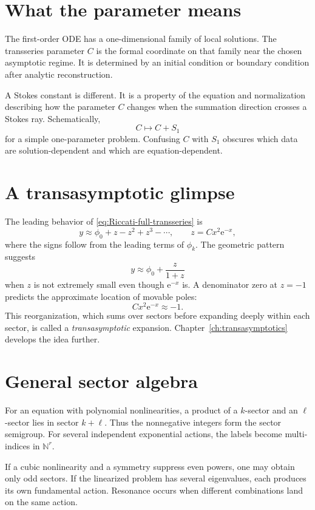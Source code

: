 \documentclass[11pt,openany]{book}
\theoremstyle{definition}
\theoremstyle{plain}
\theoremstyle{remark}
\newcommand{\N}{\mathbb{N}}
\newcommand{\e}{\mathrm{e}}
\begin{document}
\section{What the parameter means}

The first-order ODE has a one-dimensional family of local solutions. The transseries parameter $C$ is the formal coordinate on that family near the chosen asymptotic regime. It is determined by an initial condition or boundary condition after analytic reconstruction.

A Stokes constant is different. It is a property of the equation and normalization describing how the parameter $C$ changes when the summation direction crosses a Stokes ray. Schematically,
\[
 C\longmapsto C+S_1
\]
for a simple one-parameter problem. Confusing $C$ with $S_1$ obscures which data are solution-dependent and which are equation-dependent.

\section{A transasymptotic glimpse}

The leading behavior of \cref{eq:Riccati-full-transseries} is
\[
 y\approx\phi_0+
 z-z^2+z^3-\cdots,
 \qquad
 z=Cx^2\e^{-x},
\]
where the signs follow from the leading terms of $\phi_k$. The geometric pattern suggests
\begin{equation}\label{eq:Riccati-transasymptotic-leading}
 y\approx\phi_0+\frac{z}{1+z}
\end{equation}
when $z$ is not extremely small even though $\e^{-x}$ is. A denominator zero at $z=-1$ predicts the approximate location of movable poles:
\[
 Cx^2\e^{-x}\approx-1.
\]
This reorganization, which sums over sectors before expanding deeply within each sector, is called a \emph{transasymptotic} expansion. Chapter~\ref{ch:transasymptotics} develops the idea further.

\section{General sector algebra}

For an equation with polynomial nonlinearities, a product of a $k$-sector and an $\ell$-sector lies in sector $k+\ell$. Thus the nonnegative integers form the sector semigroup. For several independent exponential actions, the labels become multi-indices in $\N^r$.

If a cubic nonlinearity and a symmetry suppress even powers, one may obtain only odd sectors. If the linearized problem has several eigenvalues, each produces its own fundamental action. Resonance occurs when different combinations land on the same action.
\end{document}
